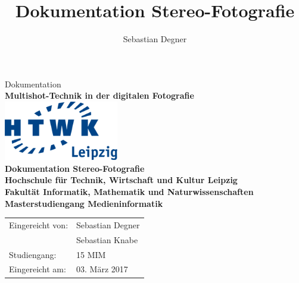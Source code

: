 \documentclass[liststotoc,bibtotoc,fontsize=14pt,]{scrreprt}
\title{Dokumentation Stereo-Fotografie}
\author{Sebastian Degner}
\begin{document}
	
	\begin{titlepage}
		\begin{center}
			\vspace{2cm}
			Dokumentation\\ \textbf{Multishot-Technik in der digitalen Fotografie}\\ 
			\vspace{2,5cm}
			\includegraphics[width=5cm]{HTWK_Logo_RGB-transparent_250.png}\\
			
			\vspace{2,5cm}
			\huge \textbf{\textsf{Dokumentation Stereo-Fotografie}} \\
			\vspace{3cm}
			\fontsize{15}{18} \textbf{Hochschule für Technik, Wirtschaft und Kultur
				Leipzig\\ Fakultät Informatik, Mathematik und Naturwissenschaften\\   Masterstudiengang Medieninformatik}\\
			\vspace{3cm}
		\end{center}
		\normalsize{
			\begin{tabular}{ll}
				Eingereicht von: & {Sebastian Degner} \\
				 & {Sebastian Knabe} \\
				Studiengang: & 15 MIM\\
				Eingereicht am: & 03. März 2017 \\
			\end{tabular}\\
		}
		
	\end{titlepage}
	
	\tableofcontents
	\clearpage
	\listoffigures
\end{document}
